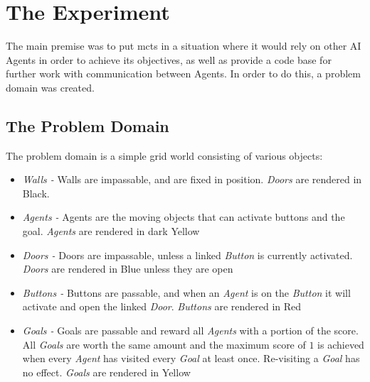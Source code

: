 \documentclass{IEEEtran}
\begin{document}
\section{The Experiment}
The main premise was to put \gls{mcts} in a situation where it would rely on other AI Agents in order to achieve its objectives, as well as provide a code base for further work with communication between Agents. In order to do this, a problem domain was created.
\subsection{The Problem Domain}
The problem domain is a simple grid world consisting of various objects:
\begin{itemize}
\item{\emph{Walls -} Walls are impassable, and are fixed in position. \emph{Doors} are rendered in Black.}
\item{\emph{Agents -} Agents are the moving objects that can activate buttons and the goal. \emph{Agents} are rendered in dark Yellow}
\item{\emph{Doors -} Doors are impassable, unless a linked \emph{Button} is currently activated. \emph{Doors} are rendered in Blue unless they are open}
\item{\emph{Buttons -} Buttons are passable, and when an \emph{Agent} is on the \emph{Button} it will activate and open the linked \emph{Door}. \emph{Buttons} are rendered in Red}
\item{\emph{Goals -} Goals are passable and reward all \emph{Agents} with a portion of the score. All \emph{Goals} are worth the same amount and the maximum score of $1$ is achieved when every \emph{Agent} has visited every \emph{Goal} at least once. Re-visiting a \emph{Goal} has no effect. \emph{Goals} are rendered in Yellow}
\end{itemize}
\end{document}
